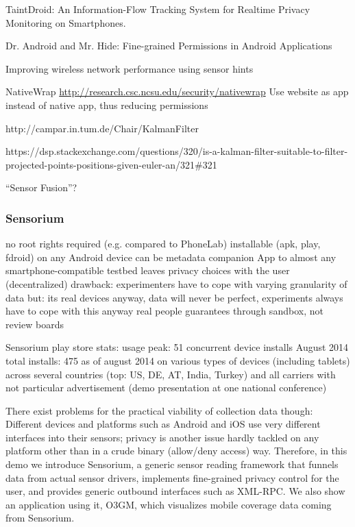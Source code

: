 TaintDroid: An Information-Flow Tracking System for Realtime Privacy Monitoring on Smartphones. \cite{enck2010taintdroid}

Dr. Android and Mr. Hide: Fine-grained Permissions in Android Applications \cite{Jeon:2012:DAM:2381934.2381938}

Improving wireless network performance using sensor hints \cite{ravindranath2011improving}

NativeWrap \url{http://research.csc.ncsu.edu/security/nativewrap} \cite{Nadkarni:2014:NAH:2627393.2627412}
Use website as app instead of native app, thus reducing permissions

http://campar.in.tum.de/Chair/KalmanFilter

https://dsp.stackexchange.com/questions/320/is-a-kalman-filter-suitable-to-filter-projected-points-positions-given-euler-an/321\#321

``Sensor Fusion''?

\subsubsection{Sensorium}


no root rights required (e.g. compared to PhoneLab)
installable (apk, play, fdroid) on any Android device
can be metadata companion App to almost any smartphone-compatible testbed
leaves privacy choices with the user (decentralized)
drawback: experimenters have to cope with varying granularity of data
but: its real devices anyway, data will never be perfect, experiments always have to cope with this anyway
real people
guarantees through sandbox, not review boards

Sensorium play store stats:
usage peak: 51 concurrent device installs August 2014
total installs: 475 as of august 2014
on various types of devices (including tablets)
across several countries (top: US, DE, AT, India, Turkey)
and all carriers
with not particular advertisement (demo presentation at one national conference)



There exist problems for the practical viability of collection data though: Different devices and platforms such as Android and iOS use very different interfaces into their sensors; privacy is another issue hardly tackled on any platform other than in a crude binary (allow/deny access) way. Therefore, in this demo we introduce Sensorium, a generic sensor reading framework that funnels data from actual sensor drivers, implements fine-grained privacy control for the user, and provides generic outbound interfaces such as \acrshort{XML}-\acrshort{RPC}. We also show an application using it, \gls{O3GM}, which visualizes mobile coverage data coming from Sensorium.

